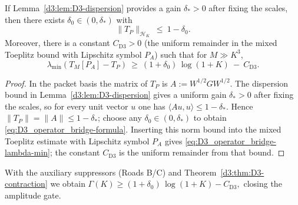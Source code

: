 \begin{theorem}\label{d3:thm:D3-contraction}
If Lemma~\ref{d3:lem:D3-dispersion} provides a gain $\delta_\ast>0$ after fixing the scales, then there exists $\delta_0\in(0,\delta_\ast)$ with
\begin{equation}\label{eq:D3_operator_bridge-formula}
  \|T_P\|_{\mathcal H_K}\ \le\ 1-\delta_0.
\end{equation}
Moreover, there is a constant $C_{\mathrm{D3}}>0$ (the uniform remainder in the mixed Toeplitz bound with Lipschitz symbol $P_A$) such that for $M\gg K^3$,
\begin{equation}\label{eq:D3_operator_bridge-lambda-min}
  \lambda_{\min}(T_M[P_A]-T_P)\ \ge\ (1+\delta_0)\,\log(1{+}K)\ -\ C_{\mathrm{D3}}.
\end{equation}
\end{theorem}

\begin{proof}
In the packet basis the matrix of $T_P$ is $A:=W^{1/2}GW^{1/2}$. The dispersion bound in
Lemma~\ref{d3:lem:D3-dispersion} gives a uniform gain $\delta_\ast>0$ after fixing the scales, so for every unit vector $u$
one has $\langle Au,u\rangle\le 1-\delta_\ast$. Hence $\|T_P\|=\|A\|\le 1-\delta_\ast$; choose any
$\delta_0\in(0,\delta_\ast)$ to obtain \eqref{eq:D3_operator_bridge-formula}. Inserting this norm bound into the mixed Toeplitz
estimate with Lipschitz symbol $P_A$ gives \eqref{eq:D3_operator_bridge-lambda-min}; the constant
$C_{\mathrm{D3}}$ is the uniform remainder from that bound.
\end{proof}

\begin{corollary}\label{d3:cor:amplitude-closure}
With the auxiliary suppressors (Roads B/C) and Theorem~\ref{d3:thm:D3-contraction} we obtain
\(
  \Gamma(K) \ge (1+\delta_0)\,\log(1+K) - C_{\mathrm{D3}},
\)
closing the amplitude gate.
\end{corollary}
